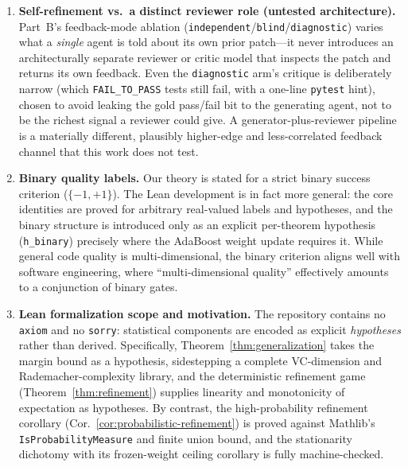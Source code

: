 \begin{enumerate}[leftmargin=*,itemsep=2pt]
    \item \textbf{Self-refinement vs.\ a distinct reviewer role (untested architecture).} Part~B's feedback-mode ablation (\texttt{independent}/\texttt{blind}/\texttt{diagnostic}) varies what a \emph{single} agent is told about its own prior patch---it never introduces an architecturally separate reviewer or critic model that inspects the patch and returns its own feedback. Even the \texttt{diagnostic} arm's critique is deliberately narrow (which \texttt{FAIL\_TO\_PASS} tests still fail, with a one-line \texttt{pytest} hint), chosen to avoid leaking the gold pass/fail bit to the generating agent, not to be the richest signal a reviewer could give. A generator-plus-reviewer pipeline is a materially different, plausibly higher-edge and less-correlated feedback channel that this work does not test.
    \item \textbf{Binary quality labels.} Our theory is stated for a strict binary success criterion ($\{-1, +1\}$). The Lean development is in fact more general: the core identities are proved for arbitrary real-valued labels and hypotheses, and the binary structure is introduced only as an explicit per-theorem hypothesis (\texttt{h\_binary}) precisely where the AdaBoost weight update requires it. While general code quality is multi-dimensional, the binary criterion aligns well with software engineering, where ``multi-dimensional quality'' effectively amounts to a conjunction of binary gates.
    \item \textbf{Lean formalization scope and motivation.} The repository contains no \texttt{axiom} and no \texttt{sorry}: statistical components are encoded as explicit \emph{hypotheses} rather than derived. Specifically, Theorem~\ref{thm:generalization} takes the \citet{schapire1998boosting} margin bound as a hypothesis, sidestepping a complete VC-dimension and Rademacher-complexity library, and the deterministic refinement game (Theorem~\ref{thm:refinement}) supplies linearity and monotonicity of expectation as hypotheses. By contrast, the high-probability refinement corollary (Cor.~\ref{cor:probabilistic-refinement}) is proved against Mathlib's \texttt{IsProbabilityMeasure} and finite union bound, and the stationarity dichotomy with its frozen-weight ceiling corollary is fully machine-checked.

\end{enumerate}
